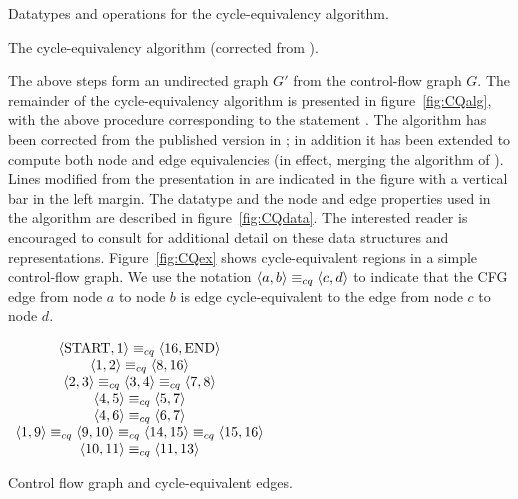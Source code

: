 \documentclass[12pt,titlepage,twoside]{article}
\begin{document}
\begin{myfigure}\small
\caption{Datatypes and operations for the cycle-equivalency algorithm.}
\label{fig:CQdata}\end{myfigure}

\begin{myfigure}\small\linespread{0.75}
\caption{The cycle-equivalency algorithm
	 (corrected from \cite{johnson93:sese}).}
\label{fig:CQalg}\end{myfigure}

The above steps form an undirected graph $G'$ from the control-flow
graph $G$.  The remainder of the cycle-equivalency algorithm is
presented in figure~\vref{fig:CQalg}, with the above procedure
corresponding to the statement .  The
algorithm has been corrected from the published version in
\cite{johnson93:sese}; in addition it has been extended to compute
both node and edge equivalencies (in effect, merging the algorithm of
\cite{johnson94:pst}).  Lines modified from the presentation in
\cite{johnson93:sese} are indicated in the figure with a vertical bar
in the left margin.  The datatype  and the node
and edge properties used in the algorithm are described in
figure~\vref{fig:CQdata}.  The interested reader is encouraged to consult
\cite{johnson93:sese} for additional detail on these data structures
and representations.%
Figure~\vref{fig:CQex} shows cycle-equivalent regions in a simple
control-flow graph.  We use the notation
$\left\langle a,b \right\rangle\equiv_{cq}\left\langle c,d \right\rangle$ to indicate that the CFG edge from node
$a$ to node $b$ is edge cycle-equivalent to the edge from node $c$ to
node $d$.

\begin{myfigure}\centering
\vertcenter{}
$\begin{array}[c]{cc}
\left\langle \text{START},1 \right\rangle\equiv_{cq}\left\langle 16,\text{END} \right\rangle\\
\left\langle 1,2 \right\rangle\equiv_{cq}\left\langle 8,16 \right\rangle\\
\left\langle 2,3 \right\rangle\equiv_{cq}\left\langle 3,4 \right\rangle\equiv_{cq}\left\langle 7,8 \right\rangle\\
\left\langle 4,5 \right\rangle\equiv_{cq}\left\langle 5,7 \right\rangle\\
\left\langle 4,6 \right\rangle\equiv_{cq}\left\langle 6,7 \right\rangle\\
\left\langle 1,9 \right\rangle\equiv_{cq}\left\langle 9,10 \right\rangle\equiv_{cq}\left\langle 14,15 \right\rangle\equiv_{cq}\left\langle 15,16 \right\rangle\\
\left\langle 10,11 \right\rangle\equiv_{cq}\left\langle 11,13 \right\rangle\\
\end{array}$
\caption{Control flow graph and cycle-equivalent edges.}
\label{fig:CQex}\end{myfigure}
\end{document}
